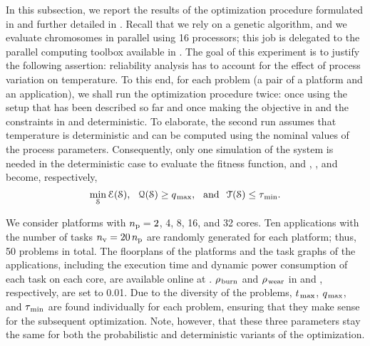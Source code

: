 In this subsection, we report the results of the optimization procedure formulated in  and further detailed in .
Recall that we rely on a genetic algorithm, and we evaluate chromosomes in parallel using 16 processors; this job is delegated to the parallel computing toolbox available in  \cite{matlab}.
The goal of this experiment is to justify the following assertion: reliability analysis has to account for the effect of process variation on temperature.
To this end, for each problem (a pair of a platform and an application), we shall run the optimization procedure twice: once using the setup that has been described so far and once making the objective in  and the constraints in  and  deterministic.
To elaborate, the second run assumes that temperature is deterministic and can be computed using the nominal values of the process parameters.
Consequently, only one simulation of the system is needed in the deterministic case to evaluate the fitness function, and , , and  become, respectively,
\[
  \min_{\EuScript{S}} \EuScript{E}(\EuScript{S}), \hspace{0.7em} \EuScript{Q}(\EuScript{S}) \geq q_{\text{\kern0.1emmax}}, \hspace{0.7em} \text{and} \hspace{0.7em} \EuScript{T}(\EuScript{S}) \leq \tau_{\text{\kern0.1emmin}}.
\]


We consider platforms with ${n_\text{p}} = 2$, 4, 8, 16, and 32 cores.
Ten applications with the number of tasks ${n_\text{v}} = 20 \, {n_\text{p}}$ are randomly generated for each platform; thus, 50 problems in total.
The floorplans of the platforms and the task graphs of the applications, including the execution time and dynamic power consumption of each task on each core, are available online at \cite{sources}.
$\rho_{\text{\kern0.1emburn}}$ and $\rho_{\text{\kern0.1emwear}}$ in  and , respectively, are set to 0.01.
Due to the diversity of the problems, $t_{\text{\kern0.1emmax}}$, $q_{\text{\kern0.1emmax}}$, and $\tau_{\text{\kern0.1emmin}}$ are found individually for each problem, ensuring that they make sense for the subsequent optimization.
Note, however, that these three parameters stay the same for both the probabilistic and deterministic variants of the optimization.

